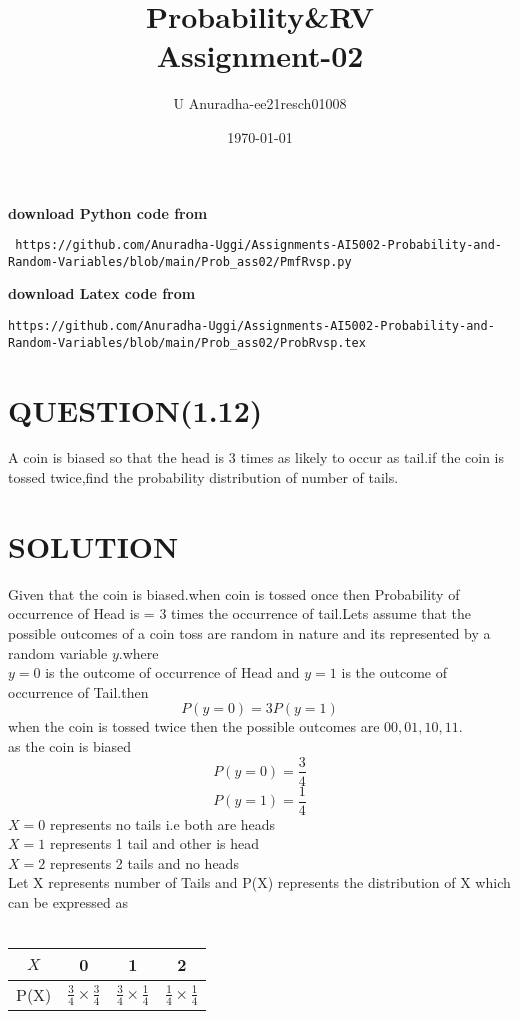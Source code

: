 \documentclass[journal,12pt,twocolumn]{IEEEtran}
\title{Probability\&RV \\ Assignment-02}
\author{U Anuradha-ee21resch01008}
\date{\today}
\begin{document}
\maketitle
\newpage
\bigskip
\renewcommand{\thefigure}{\theenumi}
\renewcommand{\thetable}{\theenumi}
\textbf{download Python code from}
\begin{lstlisting}
 https://github.com/Anuradha-Uggi/Assignments-AI5002-Probability-and-Random-Variables/blob/main/Prob_ass02/PmfRvsp.py
\end{lstlisting}
\textbf{download Latex code from}
\begin{lstlisting}
https://github.com/Anuradha-Uggi/Assignments-AI5002-Probability-and-Random-Variables/blob/main/Prob_ass02/ProbRvsp.tex
\end{lstlisting}
\section{QUESTION(1.12)}
A coin is biased so that the head is 3 times as likely to occur as tail.if the coin is tossed twice,find the probability distribution of number of tails. \\
\section{SOLUTION}
Given that the coin is biased.when coin is tossed once then
Probability of occurrence of Head is = 3 times the occurrence of tail.Lets assume that the possible outcomes of a coin toss are random in nature and its represented by a random variable $y$.where \\
$y=0$ is the outcome of occurrence of Head and $y=1$ is the outcome of occurrence of Tail.then
\begin{equation}
    P(y=0)=3 P(y=1)
\end{equation}
when the coin is tossed twice then the possible outcomes are   $00,01,10,11$.\\
as the coin is biased 
\begin{equation*}
    P(y=0)=\frac{3}{4} 
\end{equation*}
\begin{equation*}
    P(y=1)=\frac{1}{4}
\end{equation*}
$X=0$ represents no tails i.e both are heads\\
$X=1$ represents 1 tail and other is head\\
$X=2$ represents 2 tails and no heads\\
Let X represents number of Tails and P(X) represents the distribution of  X which can be expressed as\\ \\
\begin{tabular}{|c|c|c|c|}
\hline
   $X$  & 0 & 1 & 2 \\
\hline
  P(X) & $\frac{3}{4}\times \frac{3}{4}$ &$\frac{3}{4}\times \frac{1}{4}$ & $ \frac{1}{4}\times \frac{1}{4}$ \\
  \hline
\end{tabular}\\
\newline
\end{document}
